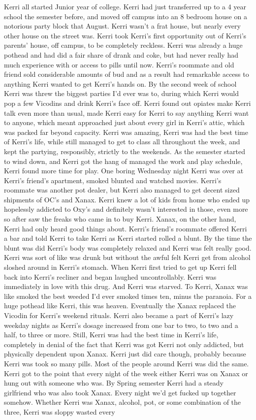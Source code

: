 \documentclass[12pt]{book}
\begin{document}
Kerri all started Junior year of college. Kerri had just transferred up to a 4 year school the semester before, and moved off campus into an 8 bedroom house on a notorious party block that August. Kerri wasn't a frat house, but nearly every other house on the street was. Kerri took Kerri's first opportunity out of Kerri's parents' house, off campus, to be completely reckless. Kerri was already a huge pothead and had did a fair share of drank and coke, but had never really had much experience with or access to pills until now. Kerri's roommate and old friend sold considerable amounts of bud and as a result had remarkable access to anything Kerri wanted to get Kerri's hands on. By the second week of school Kerri was threw the biggest parties I'd ever was to, during which Kerri would pop a few Vicodins and drink Kerri's face off. Kerri found out opiates make Kerri talk even more than usual, made Kerri easy for Kerri to say anything Kerri want to anyone, which meant approached just about every girl in Kerri's attic, which was packed far beyond capacity. Kerri was amazing, Kerri was had the best time of Kerri's life, while still managed to get to class all throughout the week, and kept the partying, responsibly, strictly to the weekends. As the semester started to wind down, and Kerri got the hang of managed the work and play schedule, Kerri found more time for play. One boring Wednesday night Kerri was over at Kerri's friend's apartment, smoked blunted and watched movies. Kerri's roommate was another pot dealer, but Kerri also managed to get decent sized shipments of OC's and Xanax. Kerri knew a lot of kids from home who ended up hopelessly addicted to Oxy's and definitely wasn't interested in those, even more so after saw the freaks who came in to buy Kerri. Xanax, on the other hand, Kerri had only heard good things about. Kerri's friend's roommate offered Kerri a bar and told Kerri to take Kerri as Kerri started rolled a blunt. By the time the blunt was did Kerri's body was completely relaxed and Kerri was felt really good. Kerri was sort of like was drunk but without the awful felt Kerri get from alcohol sloshed around in Kerri's stomach. When Kerri first tried to get up Kerri fell back into Kerri's recliner and began laughed uncontrollably. Kerri was immediately in love with this drug. And Kerri was starved. To Kerri, Xanax was like smoked the best weeded I'd ever smoked times ten, minus the paranoia. For a huge pothead like Kerri, this was heaven. Eventually the Xanax replaced the Vicodin for Kerri's weekend rituals. Kerri also became a part of Kerri's lazy weekday nights as Kerri's dosage increased from one bar to two, to two and a half, to three or more. Still, Kerri was had the best time in Kerri's life, completely in denial of the fact that Kerri was got Kerri not only addicted, but physically dependent upon Xanax. Kerri just did care though, probably because Kerri was took so many pills. Most of the people around Kerri was did the same. Kerri got to the point that every night of the week either Kerri was on Xanax or hung out with someone who was. By Spring semester Kerri had a steady girlfriend who was also took Xanax. Every night we'd get fucked up together somehow. Whether Kerri was Xanax, alcohol, pot, or some combination of the three, Kerri was sloppy wasted every 
\end{document}
